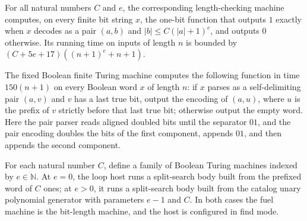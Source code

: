 \begin{theorem}
\label{Turing.FinTM.pairLenCheckTM_computes}
\leanok
{}
For all natural numbers $C$ and $e$, the corresponding length-checking machine computes,
on every finite bit string $x$, the one-bit function that outputs $1$ exactly when $x$
decodes as a pair $(a,b)$ and $|b|\le C(|a|+1)^e$, and outputs $0$ otherwise. Its
running time on inputs of length $n$ is bounded by $(C+5e+17)((n+1)^e+n+1)$.
\end{theorem}

\begin{theorem}
\label{Turing.FinTM.stripLastTM_computes}
\leanok
{}
The fixed Boolean finite Turing machine computes the following function in time
$150(n+1)$ on every Boolean word $x$ of length $n$: if $x$ parses as a self-delimiting
pair $(a,v)$ and $v$ has a last true bit, output the encoding of $(a,u)$, where $u$ is
the prefix of $v$ strictly before that last true bit; otherwise output the empty word.
Here the pair parser reads aligned doubled bits until the separator $01$, and the pair
encoding doubles the bits of the first component, appends $01$, and then appends the
second component.
\end{theorem}

\begin{definition}
\label{Turing.FinTM.splitSolveTM}
\leanok
{}
For each natural number $C$, define a family of Boolean Turing machines indexed by
$e\in\mathbb{N}$. At $e=0$, the loop host runs a split-search body built from the
prefixed word of $C$ ones; at $e>0$, it runs a split-search body built from the catalog
unary polynomial generator with parameters $e-1$ and $C$. In both cases the fuel machine
is the bit-length machine, and the host is configured in find mode.
\end{definition}


